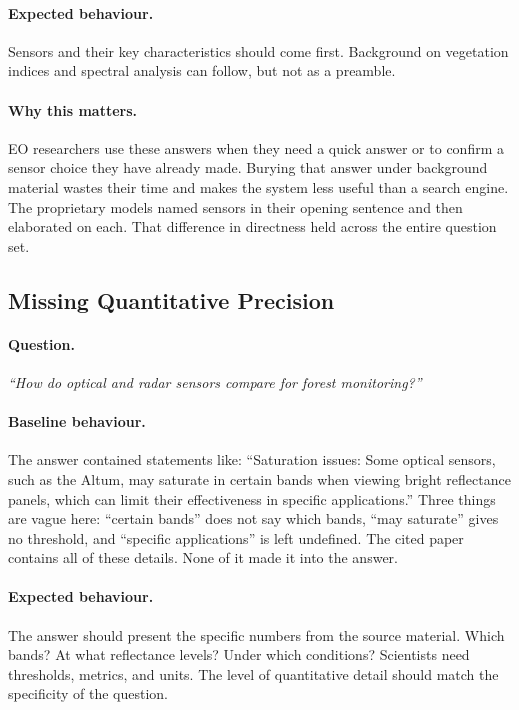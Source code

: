 \paragraph{Expected behaviour.} Sensors and their key characteristics should come first. Background on vegetation indices and spectral analysis can follow, but not as a preamble.

\paragraph{Why this matters.} EO researchers use these answers when they need a quick answer or to confirm a sensor choice they have already made. Burying that answer under background material wastes their time and makes the system less useful than a search engine. The proprietary models named sensors in their opening sentence and then elaborated on each. That difference in directness held across the entire question set.

\subsection{Missing Quantitative Precision}
\label{subsec:missing-precision-example}

\paragraph{Question.} \textit{``How do optical and radar sensors compare for forest monitoring?''}

\paragraph{Baseline behaviour.} The answer contained statements like: ``Saturation issues: Some optical sensors, such as the Altum, may saturate in certain bands when viewing bright reflectance panels, which can limit their effectiveness in specific applications.'' Three things are vague here: ``certain bands'' does not say which bands, ``may saturate'' gives no threshold, and ``specific applications'' is left undefined. The cited paper contains all of these details. None of it made it into the answer.

\paragraph{Expected behaviour.} The answer should present the specific numbers from the source material. Which bands? At what reflectance levels? Under which conditions? Scientists need thresholds, metrics, and units. The level of quantitative detail should match the specificity of the question.

